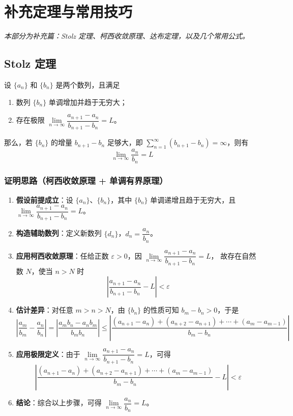 
\section{补充定理与常用技巧}
\noindent\textit{本部分为补充篇：Stolz 定理、柯西收敛原理、达布定理，以及几个常用公式。}

\subsection{Stolz 定理}
设 $\{a_n\}$ 和 $\{b_n\}$ 是两个数列，且满足
\begin{enumerate}
    \item 数列 $\{b_n\}$ 单调增加并趋于无穷大；
    \item 存在极限 $\lim\limits_{n\to\infty}\dfrac{a_{n+1}-a_n}{b_{n+1}-b_n}=L$。
\end{enumerate}
那么，若 $\{b_n\}$ 的增量 $b_{n+1}-b_n$ 足够大，即 $\sum\limits_{n=1}^{\infty}(b_{n+1}-b_n)=\infty$，则有
\[
\lim_{n\to\infty}\frac{a_n}{b_n}=L
\]

\subsubsection{证明思路（柯西收敛原理 + 单调有界原理）}
\begin{enumerate}
    \item \textbf{假设前提成立}：设 $\{a_n\}$、$\{b_n\}$，其中 $\{b_n\}$ 单调递增且趋于无穷大，且
          $\lim\limits_{n\to\infty}\dfrac{a_{n+1}-a_n}{b_{n+1}-b_n}=L$。
    \item \textbf{构造辅助数列}：定义新数列 $\{d_n\}$，$d_n=\dfrac{a_n}{b_n}$。
    \item \textbf{应用柯西收敛原理}：任给正数 $\varepsilon>0$，因 $\lim\limits_{n\to\infty}\dfrac{a_{n+1}-a_n}{b_{n+1}-b_n}=L$，
          故存在自然数 $N$，使当 $n>N$ 时
          \[
          \left|\frac{a_{n+1}-a_n}{b_{n+1}-b_n}-L\right|<\varepsilon
          \]
    \item \textbf{估计差异}：对任意 $m>n>N$，由 $\{b_n\}$ 的性质可知 $b_m-b_n>0$，于是
          \[
          \left|\frac{a_m}{b_m}-\frac{a_n}{b_n}\right|
          =\left|\frac{a_m b_n-a_n b_m}{b_m b_n}\right|
          \le\left|\frac{(a_{n+1}-a_n)+(a_{n+2}-a_{n+1})+\cdots+(a_m-a_{m-1})}{b_m-b_n}\right|
          \]
    \item \textbf{应用极限定义}：由于 $\lim\limits_{n\to\infty}\dfrac{a_{n+1}-a_n}{b_{n+1}-b_n}=L$，可得
          \[
          \left|\frac{(a_{n+1}-a_n)+(a_{n+2}-a_{n+1})+\cdots+(a_m-a_{m-1})}{b_m-b_n}-L\right|<\varepsilon
          \]
    \item \textbf{结论}：综合以上步骤，可得 $\lim\limits_{n\to\infty}\dfrac{a_n}{b_n}=L$。
\end{enumerate}

